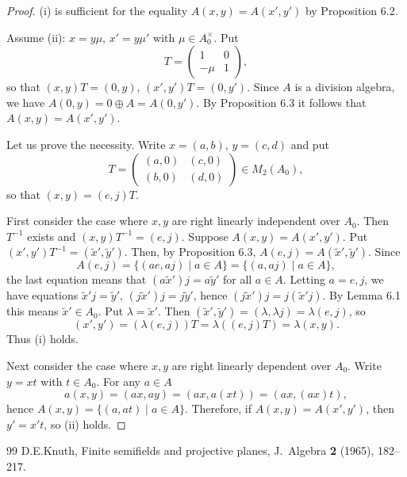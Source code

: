 \documentclass[10pt,a4paper]{amsart}
\begin{document}
\begin{proof}
(i) is sufficient for the equality $A(x,y)=A(x',y')$ by Proposition 6.2.

Assume (ii):
$x=y\mu$, $x'=y\mu'$ with $\mu\in A_0^{\times}$.
Put
$$
T=\begin{pmatrix} 1 & 0 \\ -\mu & 1 \end{pmatrix},
$$
so that
$(x,y)T=(0,y)$, $(x',y')T=(0,y')$.
Since $A$ is a division algebra, we have $A(0,y)=0\oplus A=A(0,y')$.
By Proposition 6.3 it follows that $A(x,y)=A(x',y')$.




Let us prove the necessity.
Write $x=(a,b)$, $y=(c,d)$ and
put
$$
T=\begin{pmatrix} (a,0) & (c,0) \\
(b,0) & (d,0) \end{pmatrix}
\in M_2(A_0),
$$
so that
$(x,y)=(e,j)T$.


First consider the case where $x,y$ are right linearly independent over $A_0$.
Then $T^{-1}$ exists and
$(x,y)T^{-1}=(e,j)$.
Suppose $A(x,y)=A(x',y')$.
Put $(x',y')T^{-1}=(\tilde x',\tilde y')$.
Then, by Proposition 6.3,
$A(e,j)=A(\tilde x',\tilde y')$.
Since
$$
A(e,j)=\{(ae,aj)\mid a\in A\}=\{(a,aj)\mid a\in A\},
$$
the last equation  means that
$(a\tilde x')j=a\tilde y' $ for all $a\in A$.
Letting $a=e, j$, we have equations
$\tilde x'j=\tilde y'$, 
$(j\tilde x')j=j\tilde y'$, 
hence
$(j\tilde x')j=j(\tilde x' j)$.
By Lemma 6.1 this means   $\tilde x'\in A_0$.
Put $\lambda=\tilde x'$. Then
$(\tilde x',\tilde y')=(\lambda, \lambda j)=\lambda(e,j)$, so
$$
(x',y')=(\lambda(e,j))T=\lambda((e,j)T)=\lambda(x,y).
$$
Thus (i) holds.


Next consider the case where $x,y$ are right linearly dependent over $A_0$.
 Write $y=xt$ with $t\in A_0$.
For any $a\in A$
$$
a(x,y)=(ax,ay)=(ax,a(xt))=(ax,(ax)t),
$$
hence
$A(x,y)=\{(a,at)\mid a\in A\}$.
Therefore,
if $A(x,y)=A(x',y')$, then $y'=x't$, so (ii) holds.



\end{proof}


\begin{thebibliography}{99}
 D.E.Knuth, Finite semifields and projective planes, J.\ Algebra \textbf{2} (1965), 182--217.
\end{thebibliography}
\end{document}
